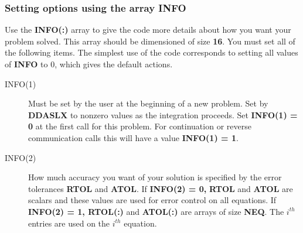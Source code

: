 \documentclass[twoside]{MATH77}
\begin{document}
\subsubsection{Setting options using the array \textbf{INFO}\label{INFO}}
Use the \textbf{INFO(:)} array to give the code more details about how
you want your problem solved.  This array should be dimensioned of size
\textbf{16}. You must set all of the following items.
The simplest use of the code corresponds to setting all values of
\textbf{INFO} to 0, which gives the default actions.\vspace{-8pt}
\begin{description}
\item[INFO(1)] \label{info1} Must be set by the user at the beginning
  of a new problem.  Set by \textbf{DDASLX} to nonzero values as the
  integration proceeds.  Set \textbf{INFO(1) = 0 }at the first call
  for this problem.  For continuation or reverse
  communication calls this will have a value \textbf{INFO(1) = 1}.
\item[INFO(2)] \label{info2} How much accuracy you want of your
  solution is specified by the error tolerances \textbf{RTOL} and
  \textbf{ATOL}. If \textbf{INFO(2) = 0,} \textbf{RTOL} and
  \textbf{ATOL }are scalars and these values are used for error
  control on all equations.  If \textbf{INFO(2) = 1, RTOL(:)} and
  \textbf{ATOL(:) }are arrays of size \textbf{NEQ}.  The $i^{th}$
  entries are used on the $i^{th}$ equation.
  

\end{description}
\end{document}
